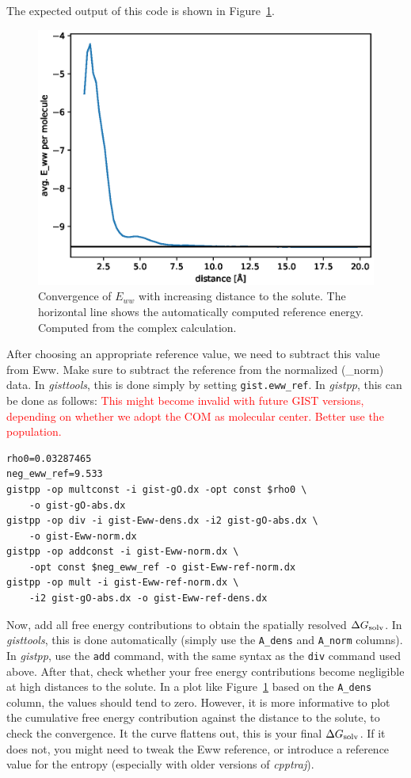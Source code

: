 \documentclass[9pt,tutorial]{livecoms}
\newcommand{\dgsolv}{\Delta G_\textup{solv}}
\newcommand{\software}{\emph}
\newcommand{\todo}{\textcolor{red}}
\newcommand\inlinecode{\texttt}
\begin{document}
The expected output of this code is shown in Figure~\ref{fig_ewwref}.

\begin{figure}
	\centering
	\includegraphics[width=0.8\linewidth]{figures/Eww_convergence.eps}
	\caption{Convergence of $E_{ww}$ with increasing distance to the solute. The horizontal line shows the automatically computed reference energy. Computed from the complex calculation.}\label{fig_ewwref}
\end{figure}

After choosing an appropriate reference value, we need to subtract this value from Eww.
Make sure to subtract the reference from the normalized (\_norm) data.
In \software{gisttools}, this is done simply by setting \inlinecode{gist.eww\_ref}.
In \software{gistpp}, this can be done as follows: \todo{This might become invalid with future GIST versions, depending on whether we adopt the COM as molecular center.} \todo{Better use the population.}

\begin{lstlisting}
rho0=0.03287465
neg_eww_ref=9.533
gistpp -op multconst -i gist-gO.dx -opt const $rho0 \
    -o gist-gO-abs.dx 
gistpp -op div -i gist-Eww-dens.dx -i2 gist-gO-abs.dx \
    -o gist-Eww-norm.dx
gistpp -op addconst -i gist-Eww-norm.dx \
    -opt const $neg_eww_ref -o gist-Eww-ref-norm.dx
gistpp -op mult -i gist-Eww-ref-norm.dx \
    -i2 gist-gO-abs.dx -o gist-Eww-ref-dens.dx
\end{lstlisting}

Now, add all free energy contributions to obtain the spatially resolved $\dgsolv$.
In \software{gisttools}, this is done automatically (simply use the \inlinecode{A\_dens} and \inlinecode{A\_norm} columns).
In \software{gistpp}, use the \inlinecode{add} command, with the same syntax as the \inlinecode{div} command used above.
After that, check whether your free energy contributions become negligible at high distances to the solute.
In a plot like Figure~\ref{fig_ewwref} based on the \inlinecode{A\_dens} column, the values should tend to zero.
However, it is more informative to plot the cumulative free energy contribution against the distance to the solute, to check the convergence.
It the curve flattens out, this is your final $\dgsolv$\@.
If it does not, you might need to tweak the Eww reference, or introduce a reference value for the entropy (especially with older versions of \software{cpptraj}).
\end{document}
